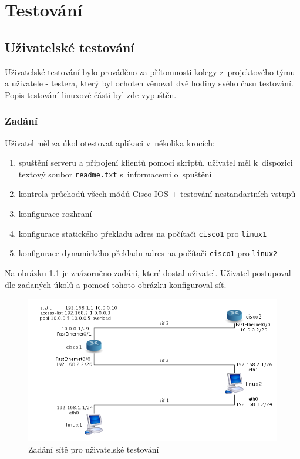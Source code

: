 \chapter{Testování}


\section{Uživatelské testování}
Uživatelské testování bylo prováděno za přítomnosti kolegy z~projektového týmu a uživatele - testera, který byl ochoten věnovat dvě hodiny svého času testování. Popis testování linuxové části byl zde vypuštěn.

\subsection{Zadání}
Uživatel měl za úkol otestovat aplikaci v~několika krocích:
\begin{enumerate}
 \item spuštění serveru a připojení klientů pomocí skriptů, uživatel měl k~dispozici textový soubor \verb|readme.txt| s~informacemi o~spuštění
 \item kontrola průchodů všech módů Cisco IOS + testování nestandartních vstupů
 \item konfigurace rozhraní
 \item konfigurace statického překladu adres na počítači \verb|cisco1| pro \verb|linux1|
 \item konfigurace dynamického překladu adres na počítači \verb|cisco1| pro \verb|linux2|
\end{enumerate}

Na obrázku \ref{fig:testovani} je znázorněno zadání, které dostal uživatel. Uživatel postupoval dle zadaných úkolů a pomocí tohoto obrázku konfiguroval síť.

\begin{figure}[h]
\begin{center}
\includegraphics[width=15cm]{figures/testovani}
\caption{Zadání sítě pro uživatelské testování}
\label{fig:testovani}
\end{center}
\end{figure}


